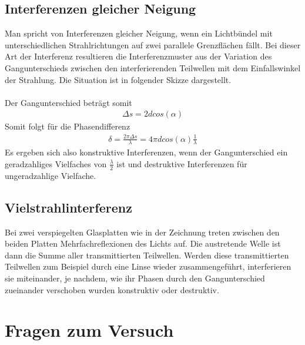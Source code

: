 \documentclass[a4paper,10pt]{scrartcl}
\begin{document}
	\subsection{Interferenzen gleicher Neigung}
	Man spricht von Interferenzen gleicher Neigung, wenn ein Lichtbündel mit unterschiedlichen Strahlrichtungen
	auf zwei parallele Grenzflächen fällt. Bei dieser Art der Interferenz resultieren die Interferenzmuster aus der Variation
	des Gangunterschieds zwischen den interferierenden Teilwellen mit dem Einfallswinkel der Strahlung. Die Situation ist in folgender Skizze dargestellt.\\
	\\
	Der Gangunterschied beträgt somit
	\begin{align*}
	\Delta s=2dcos(\alpha)
	\end{align*}
	Somit folgt für die Phasendifferenz
	\begin{align*}
	\delta=\frac{2\pi \Delta s}{\lambda}=4\pi d cos(\alpha)\frac{1}{\lambda}
	\end{align*}
	Es ergeben sich also konstruktive Interferenzen, wenn der Gangunterschied ein geradzahliges Vielfaches von \(\frac{\lambda}{2}\) ist und destruktive Interferenzen für ungeradzahlige Vielfache.
	
	\subsection{Vielstrahlinterferenz}
	Bei zwei verspiegelten Glasplatten wie in der Zeichnung treten zwischen den beiden Platten Mehrfachreflexionen des Lichts auf. Die austretende Welle ist dann die Summe aller transmittierten Teilwellen. Werden diese transmittierten Teilwellen zum Beispiel durch eine Linse wieder zusammengeführt, interferieren sie miteinander, je nachdem, wie ihr Phasen durch den Gangunterschied zueinander verschoben wurden konstruktiv oder destruktiv.
	
	\section{Fragen zum Versuch}
\end{document}
